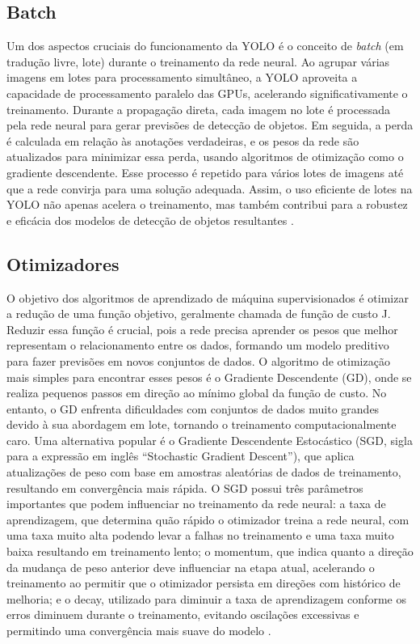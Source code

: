 \subsection{Batch}
\label{sec:batch}

Um dos aspectos cruciais do funcionamento da YOLO é o conceito de \textit{batch} (em tradução livre, lote) durante o treinamento da rede neural. Ao agrupar várias imagens em lotes para processamento simultâneo, a YOLO aproveita a capacidade de processamento paralelo das GPUs, acelerando significativamente o treinamento. Durante a propagação direta, cada imagem no lote é processada pela rede neural para gerar previsões de detecção de objetos. Em seguida, a perda é calculada em relação às anotações verdadeiras, e os pesos da rede são atualizados para minimizar essa perda, usando algoritmos de otimização como o gradiente descendente. Esse processo é repetido para vários lotes de imagens até que a rede convirja para uma solução adequada. Assim, o uso eficiente de lotes na YOLO não apenas acelera o treinamento, mas também contribui para a robustez e eficácia dos modelos de detecção de objetos resultantes \cite{goodfellow2016deep}.

\subsection{Otimizadores}
\label{sec:otimizadores}

O objetivo dos algoritmos de aprendizado de máquina supervisionados é otimizar a redução de uma função objetivo, geralmente chamada de função de custo J. Reduzir essa função é crucial, pois a rede precisa aprender os pesos que melhor representam o relacionamento entre os dados, formando um modelo preditivo para fazer previsões em novos conjuntos de dados. O algoritmo de otimização mais simples para encontrar esses pesos é o Gradiente Descendente (GD), onde se realiza pequenos passos em direção ao mínimo global da função de custo. No entanto, o GD enfrenta dificuldades com conjuntos de dados muito grandes devido à sua abordagem em lote, tornando o treinamento computacionalmente caro. Uma alternativa popular é o Gradiente Descendente Estocástico (SGD, sigla para a expressão em inglês “Stochastic Gradient Descent”), que aplica atualizações de peso com base em amostras aleatórias de dados de treinamento, resultando em convergência mais rápida. O  SGD possui três parâmetros importantes que podem influenciar no treinamento da rede neural: a taxa de aprendizagem, que determina quão rápido o otimizador treina a rede neural, com uma taxa muito alta podendo levar a falhas no treinamento e uma taxa muito baixa resultando em treinamento lento; o momentum, que indica quanto a direção da mudança de peso anterior deve influenciar na etapa atual, acelerando o treinamento ao permitir que o otimizador persista em direções com histórico de melhoria; e o decay, utilizado para diminuir a taxa de aprendizagem conforme os erros diminuem durante o treinamento, evitando oscilações excessivas e permitindo uma convergência mais suave do modelo \cite{silva2018estudo}.

